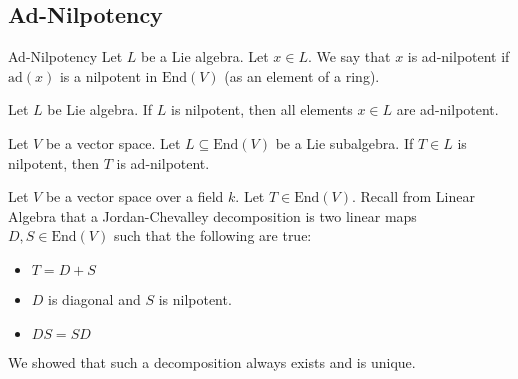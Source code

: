 \documentclass[a4paper]{article}
\begin{document}
\subsection{Ad-Nilpotency}
\begin{defn}{Ad-Nilpotency}{} Let $L$ be a Lie algebra. Let $x\in L$. We say that $x$ is ad-nilpotent if $\text{ad}(x)$ is a nilpotent in $\text{End}(V)$ (as an element of a ring). 
\end{defn}

\begin{lmm}{}{} Let $L$ be Lie algebra. If $L$ is nilpotent, then all elements $x\in L$ are ad-nilpotent. 
\end{lmm}

\begin{lmm}{}{} Let $V$ be a vector space. Let $L\subseteq\text{End}(V)$ be a Lie subalgebra. If $T\in L$ is nilpotent, then $T$ is ad-nilpotent. 
\end{lmm}

Let $V$ be a vector space over a field $k$. Let $T\in\text{End}(V)$. Recall from Linear Algebra that a Jordan-Chevalley decomposition is two linear maps $D,S\in\text{End}(V)$ such that the following are true: 
\begin{itemize}
\item $T=D+S$
\item $D$ is diagonal and $S$ is nilpotent. 
\item $DS=SD$
\end{itemize}
We showed that such a decomposition always exists and is unique. 
\end{document}

